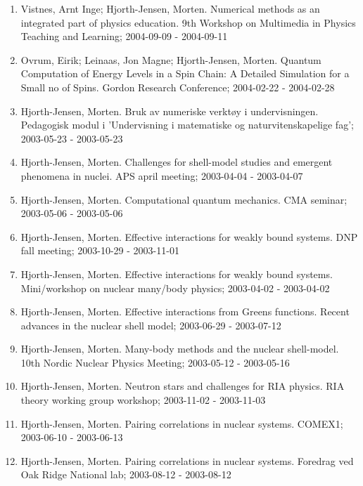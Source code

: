 \documentclass[a4wide,10pt]{article}
\begin{document}
\begin{enumerate}
\item Vistnes, Arnt Inge; Hjorth-Jensen, Morten. Numerical methods as an integrated part of physics education. 9th Workshop on Multimedia in Physics Teaching and Learning; 2004-09-09 - 2004-09-11

\item Ovrum, Eirik; Leinaas, Jon Magne; Hjorth-Jensen, Morten. Quantum Computation of Energy Levels in a Spin Chain: A Detailed Simulation for a Small no of Spins. Gordon Research Conference; 2004-02-22 - 2004-02-28

\item Hjorth-Jensen, Morten. Bruk av numeriske verktøy i undervisningen. Pedagogisk modul i 'Undervisning i matematiske og naturvitenskapelige fag'; 2003-05-23 - 2003-05-23

\item Hjorth-Jensen, Morten. Challenges for shell-model studies and emergent phenomena in nuclei. APS april meeting; 2003-04-04 - 2003-04-07

\item Hjorth-Jensen, Morten.  Computational quantum mechanics. CMA seminar; 2003-05-06 - 2003-05-06

\item Hjorth-Jensen, Morten. Effective interactions for weakly bound systems. DNP fall meeting; 2003-10-29 - 2003-11-01

\item Hjorth-Jensen, Morten. Effective interactions for weakly bound systems. Mini/workshop on nuclear many/body physics; 2003-04-02 - 2003-04-02

\item Hjorth-Jensen, Morten. Effective interactions from Greens functions. Recent advances in the nuclear shell model; 2003-06-29 - 2003-07-12

\item Hjorth-Jensen, Morten. Many-body methods and the nuclear shell-model. 10th Nordic Nuclear Physics Meeting; 2003-05-12 - 2003-05-16

\item Hjorth-Jensen, Morten. Neutron stars and challenges for RIA physics. RIA theory working group workshop; 2003-11-02 - 2003-11-03

\item Hjorth-Jensen, Morten. Pairing correlations in nuclear systems. COMEX1; 2003-06-10 - 2003-06-13

\item Hjorth-Jensen, Morten. Pairing correlations in nuclear systems. Foredrag ved Oak Ridge National lab; 2003-08-12 - 2003-08-12


\end{enumerate}
\end{document}
